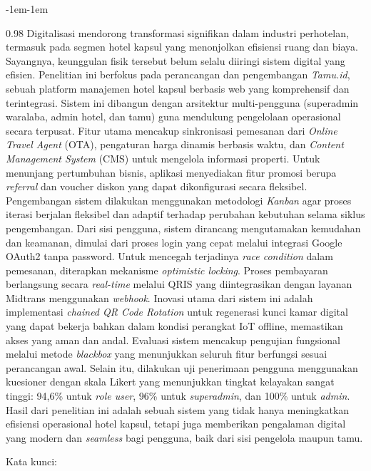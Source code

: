 \begin{adjustwidth}{-1em}{-1em}
\begin{spacing}{0.98}
        Digitalisasi mendorong transformasi signifikan dalam industri perhotelan, termasuk pada segmen hotel kapsul yang menonjolkan efisiensi ruang dan biaya. Sayangnya, keunggulan fisik tersebut belum selalu diiringi sistem digital yang efisien. Penelitian ini berfokus pada perancangan dan pengembangan \textit{Tamu.id}, sebuah platform manajemen hotel kapsul berbasis web yang komprehensif dan terintegrasi. Sistem ini dibangun dengan arsitektur multi-pengguna (superadmin waralaba, admin hotel, dan tamu) guna mendukung pengelolaan operasional secara terpusat. Fitur utama mencakup sinkronisasi pemesanan dari \textit{Online Travel Agent} (OTA), pengaturan harga dinamis berbasis waktu, dan \textit{Content Management System} (CMS) untuk mengelola informasi properti. Untuk menunjang pertumbuhan bisnis, aplikasi menyediakan fitur promosi berupa \textit{referral} dan voucher diskon yang dapat dikonfigurasi secara fleksibel. Pengembangan sistem dilakukan menggunakan metodologi \textit{Kanban} agar proses iterasi berjalan fleksibel dan adaptif terhadap perubahan kebutuhan selama siklus pengembangan. Dari sisi pengguna, sistem dirancang mengutamakan kemudahan dan keamanan, dimulai dari proses login yang cepat melalui integrasi Google OAuth2 tanpa password. Untuk mencegah terjadinya \textit{race condition} dalam pemesanan, diterapkan mekanisme \textit{optimistic locking}. Proses pembayaran berlangsung secara \textit{real-time} melalui QRIS yang diintegrasikan dengan layanan Midtrans menggunakan \textit{webhook}. Inovasi utama dari sistem ini adalah implementasi \textit{chained QR Code Rotation} untuk regenerasi kunci kamar digital yang dapat bekerja bahkan dalam kondisi perangkat IoT offline, memastikan akses yang aman dan andal. Evaluasi sistem mencakup pengujian fungsional melalui metode \textit{blackbox} yang menunjukkan seluruh fitur berfungsi sesuai perancangan awal. Selain itu, dilakukan uji penerimaan pengguna menggunakan kuesioner dengan skala Likert yang menunjukkan tingkat kelayakan sangat tinggi: 94{,}6\% untuk \textit{role user}, 96\% untuk \textit{superadmin}, dan 100\% untuk \textit{admin}. Hasil dari penelitian ini adalah sebuah sistem yang tidak hanya meningkatkan efisiensi operasional hotel kapsul, tetapi juga memberikan pengalaman digital yang modern dan \textit{seamless} bagi pengguna, baik dari sisi pengelola maupun tamu.



        \noindent Kata kunci: \katakunci

        \endgroup
    \end{spacing}
\end{adjustwidth}